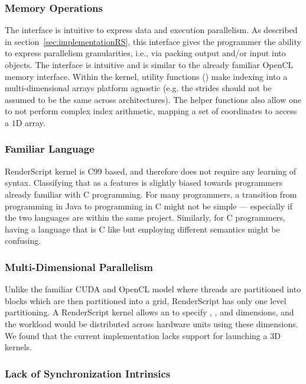 \subsubsection{Memory Operations}

The  interface is intuitive to express data and
execution parallelism. As described in section~\ref{sec:implementationRS}, this
 interface gives the programmer the ability to express parallelism
granularities, i.e., via packing output and/or input into  objects.
The interface is intuitive and is similar to the already familiar OpenCL memory interface.
Within the kernel, utility functions () make indexing
 into a multi-dimensional arrays platform agnostic
 (e.g. the strides should not be assumed to be the same across architectures).
The helper functions also allow one to not perform complex index arithmetic, mapping
 a set of coordinates to access a $1$D array.


\subsubsection{Familiar Language}

RenderScript kernel is C99 based, and therefore does not require any learning of syntax.
Classifying that as a features is slightly biased towards programmers already familiar with
 C programming.
For many programmers, a transition from programming in Java to programming in C might not be simple
 --- especially if the two languages are within the same project.
Similarly, for C programmers, having a language that is C like but employing different semantics
  might be confusing.


\subsubsection{Multi-Dimensional Parallelism}


Unlike the familiar CUDA and OpenCL model where threads are partitioned into blocks which are
  then partitioned into a grid, RenderScript has only one level partitioning.
A RenderScript kernel allows an  to specify , , and 
dimensions, and the workload would be distributed across hardware units using
these dimensions.
We found that the current implementation lacks support for launching a $3$D kernels.

\subsubsection{Lack of Synchronization Intrinsics}

